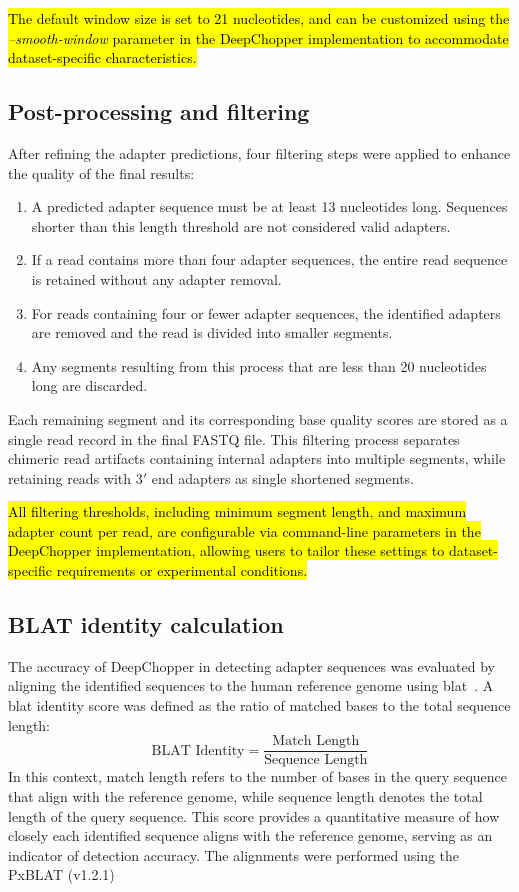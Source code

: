 \documentclass[pdflatex,sn-nature, lineno]{sn-jnl}%
\begin{document}
\hl{The default window size is set to 21 nucleotides, and can be customized using the \emph{--smooth-window} parameter in the DeepChopper implementation to accommodate dataset-specific characteristics.}

\subsection{Post-processing and filtering}

After refining the adapter predictions, four filtering steps were applied to enhance the quality of the final results:
\vspace{.5em}
\begin{enumerate}[leftmargin=2em]
	\item A predicted adapter sequence must be at least 13 nucleotides long. Sequences shorter than this length threshold are not considered valid adapters.
	\item If a read contains more than four adapter sequences, the entire read sequence is retained without any adapter removal.
	\item For reads containing four or fewer adapter sequences, the identified adapters are removed and the read is divided into smaller segments.
	\item Any segments resulting from this process that are less than 20 nucleotides long are discarded.
\end{enumerate}
\vspace{.5em}

Each remaining segment and its corresponding base quality scores are stored as a single read record in the final FASTQ file.
This filtering process separates chimeric read artifacts containing internal adapters into multiple segments, while retaining reads with $3'$ end adapters as single shortened segments.

\hl{All filtering thresholds, including minimum segment length, and maximum adapter count per read, are configurable via command-line parameters in the DeepChopper implementation, allowing users to tailor these settings to dataset-specific requirements or experimental conditions.}

\subsection{BLAT identity calculation}

The accuracy of DeepChopper in detecting adapter sequences was evaluated by aligning the identified sequences to the human reference genome using \gls{blat}~\cite{kent2002blat}.
A \gls{blat} identity score was defined as the ratio of matched bases to the total sequence length:
\[
	\textrm{BLAT Identity} = \frac{\textrm{Match Length}}{\textrm{Sequence Length}}
\]
In this context, match length refers to the number of bases in the query sequence that align with the reference genome, while sequence length denotes the total length of the query sequence.
This score provides a quantitative measure of how closely each identified sequence aligns with the reference genome, serving as an indicator of detection accuracy.
The alignments were performed using the PxBLAT (v1.2.1)~\cite{li2024pxblat}
\end{document}
